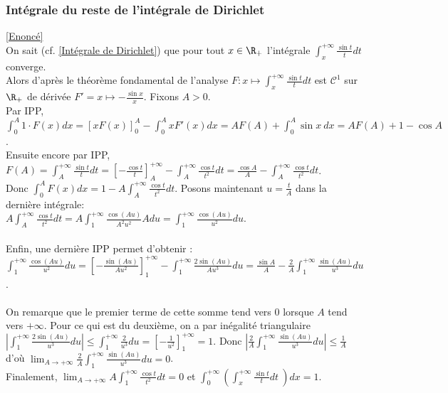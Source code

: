 \documentclass{book}
\begin{document}
	\subsubsection{Intégrale du reste de l'intégrale de Dirichlet }
	\label{Intégrale du reste de l'intégrale de Dirichlet corrigé}
	\textcolor{blue}{\hyperref[restedirichlet]{[Enoncé]}}\\
	On sait (cf. \ref{Intégrale de Dirichlet}) que pour tout $x\in \R_+$ l'intégrale $\displaystyle\int_x^{+\infty}\frac{\sin t}{t}dt$ converge.\\
	Alors d'après le théorème fondamental de l'analyse $F:x\mapsto\displaystyle\int_x^{+\infty}\frac{\sin t}{t}dt$ est $\mathcal C^1$ sur $\R_+$ de dérivée $F'=x\mapsto -\displaystyle\frac{\sin x}{x}$. Fixons $A>0$.\\
	Par IPP, $\displaystyle\int_0^A1\cdot F(x)dx=\left[xF(x)\right]_0^A-\int_0^AxF'(x)dx=AF(A)+\int_0^A\sin x\ dx=AF(A)+1-\cos A$.\\
	Ensuite encore par IPP, $F(A)=\displaystyle\int_A^{+\infty}\frac{\sin t}{t}dt=\left[-\frac{\cos t}{t}\right]_A^{+\infty}-\int_A^{+\infty}\frac{\cos t}{t^2}dt=\frac{\cos A}{A}-\int_A^{+\infty}\frac{\cos t}{t^2}dt$.\\
	Donc $\displaystyle\int_0^AF(x)dx=1-A\int_A^{+\infty}\frac{\cos t}{t^2}dt$. Posons maintenant $u=\displaystyle\frac{t}{A}$ dans la dernière intégrale:\\
	$A\displaystyle\int_A^{+\infty}\frac{\cos t}{t^2}dt=A\int_1^{+\infty}\frac{\cos(Au)}{A^2u^2}Adu=\int_1^{+\infty}\frac{\cos(Au)}{u^2}du$.\\\\
	Enfin, une dernière IPP permet d'obtenir :\\
	$\displaystyle\int_1^{+\infty}\frac{\cos(Au)}{u^2}du=\left[-\frac{\sin(Au)}{Au^2}\right]_1^{+\infty}-\int_1^{+\infty}\frac{2\sin(Au)}{Au^3}du=\frac{\sin A}{A}-\frac{2}{A}\int_1^{+\infty}\frac{\sin(Au)}{u^3}du$.\\\\
	On remarque que le premier terme de cette somme tend vers $0$ lorsque $A$ tend vers $+\infty$. Pour ce qui est du deuxième, on a par inégalité triangulaire $\displaystyle\left|\int_1^{+\infty}\frac{2\sin(Au)}{u^3}du\right|\leq \int_1^{+\infty}\frac{2}{u^3}du=\left[-\frac{1}{u^2}\right]_1^{+\infty}=1$. Donc $\displaystyle\left|\frac{2}{A}\int_1^{+\infty}\frac{\sin(Au)}{u^3}du\right|\leq \frac{1}{A}$ d'où $\displaystyle\lim_{A\to+\infty}\frac{2}{A}\int_1^{+\infty}\frac{\sin(Au)}{u^3}du=0$.\\
	Finalement, $\displaystyle\lim_{A\to+\infty}A\int_1^{+\infty}\frac{\cos t}{t^2}dt=0$ et $\displaystyle\int_0^{+\infty}\left(\int_x^{+\infty}\frac{\sin t}{t}dt\ \right)dx=1$.
	
\end{document}
